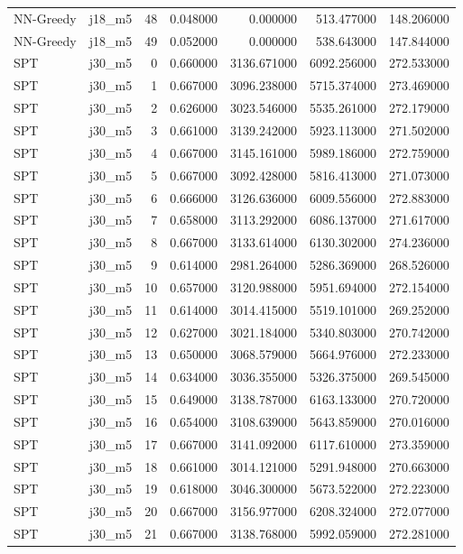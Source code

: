 \begin{tabular}{llrrrrr}
NN-Greedy & j18_m5 & 48 & 0.048000 & 0.000000 & 513.477000 & 148.206000 \\
NN-Greedy & j18_m5 & 49 & 0.052000 & 0.000000 & 538.643000 & 147.844000 \\
SPT & j30_m5 & 0 & 0.660000 & 3136.671000 & 6092.256000 & 272.533000 \\
SPT & j30_m5 & 1 & 0.667000 & 3096.238000 & 5715.374000 & 273.469000 \\
SPT & j30_m5 & 2 & 0.626000 & 3023.546000 & 5535.261000 & 272.179000 \\
SPT & j30_m5 & 3 & 0.661000 & 3139.242000 & 5923.113000 & 271.502000 \\
SPT & j30_m5 & 4 & 0.667000 & 3145.161000 & 5989.186000 & 272.759000 \\
SPT & j30_m5 & 5 & 0.667000 & 3092.428000 & 5816.413000 & 271.073000 \\
SPT & j30_m5 & 6 & 0.666000 & 3126.636000 & 6009.556000 & 272.883000 \\
SPT & j30_m5 & 7 & 0.658000 & 3113.292000 & 6086.137000 & 271.617000 \\
SPT & j30_m5 & 8 & 0.667000 & 3133.614000 & 6130.302000 & 274.236000 \\
SPT & j30_m5 & 9 & 0.614000 & 2981.264000 & 5286.369000 & 268.526000 \\
SPT & j30_m5 & 10 & 0.657000 & 3120.988000 & 5951.694000 & 272.154000 \\
SPT & j30_m5 & 11 & 0.614000 & 3014.415000 & 5519.101000 & 269.252000 \\
SPT & j30_m5 & 12 & 0.627000 & 3021.184000 & 5340.803000 & 270.742000 \\
SPT & j30_m5 & 13 & 0.650000 & 3068.579000 & 5664.976000 & 272.233000 \\
SPT & j30_m5 & 14 & 0.634000 & 3036.355000 & 5326.375000 & 269.545000 \\
SPT & j30_m5 & 15 & 0.649000 & 3138.787000 & 6163.133000 & 270.720000 \\
SPT & j30_m5 & 16 & 0.654000 & 3108.639000 & 5643.859000 & 270.016000 \\
SPT & j30_m5 & 17 & 0.667000 & 3141.092000 & 6117.610000 & 273.359000 \\
SPT & j30_m5 & 18 & 0.661000 & 3014.121000 & 5291.948000 & 270.663000 \\
SPT & j30_m5 & 19 & 0.618000 & 3046.300000 & 5673.522000 & 272.223000 \\
SPT & j30_m5 & 20 & 0.667000 & 3156.977000 & 6208.324000 & 272.077000 \\
SPT & j30_m5 & 21 & 0.667000 & 3138.768000 & 5992.059000 & 272.281000 \\

\end{tabular}
